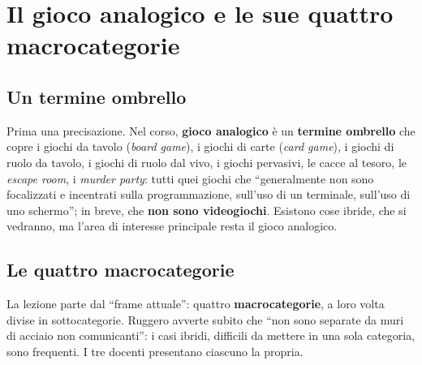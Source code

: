\section{Il gioco analogico e le sue quattro macrocategorie}
\label{a2:sec:macro}

\subsection{Un termine ombrello}

Prima una precisazione. Nel corso, \textbf{gioco analogico} è un
\textbf{termine ombrello} che copre i giochi da tavolo (\emph{board game}), i
giochi di carte (\emph{card game}), i giochi di ruolo da tavolo, i giochi di
ruolo dal vivo, i giochi pervasivi, le cacce al tesoro, le \emph{escape room},
i \emph{murder party}: tutti quei giochi che ``generalmente non sono focalizzati
e incentrati sulla programmazione, sull'uso di un terminale, sull'uso di uno
schermo''; in breve, che \textbf{non sono videogiochi}. Esistono cose ibride,
che si vedranno, ma l'area di interesse principale resta il gioco analogico.

\subsection{Le quattro macrocategorie}



La lezione parte dal ``frame attuale'': quattro \textbf{macrocategorie}, a loro
volta divise in sottocategorie. Ruggero avverte subito che ``non sono separate da
muri di acciaio non comunicanti'': i casi ibridi, difficili da mettere in una
sola categoria, sono frequenti. I tre docenti presentano ciascuno la propria.

